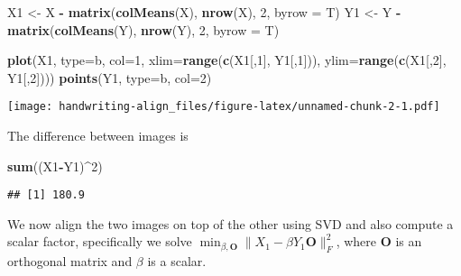 \documentclass[
]{article}
\newenvironment{Shaded}{\begin{snugshade}}{\end{snugshade}}
\newcommand{\AttributeTok}[1]{\textcolor[rgb]{0.13,0.29,0.53}{#1}}
\newcommand{\DecValTok}[1]{\textcolor[rgb]{0.00,0.00,0.81}{#1}}
\newcommand{\FunctionTok}[1]{\textcolor[rgb]{0.13,0.29,0.53}{\textbf{#1}}}
\newcommand{\NormalTok}[1]{#1}
\newcommand{\OtherTok}[1]{\textcolor[rgb]{0.56,0.35,0.01}{#1}}
\newcommand{\SpecialCharTok}[1]{\textcolor[rgb]{0.81,0.36,0.00}{\textbf{#1}}}
\newcommand{\StringTok}[1]{\textcolor[rgb]{0.31,0.60,0.02}{#1}}
\begin{document}
\begin{Shaded}
\begin{Highlighting}[]
\NormalTok{X1 }\OtherTok{\textless{}{-}}\NormalTok{ X }\SpecialCharTok{{-}} \FunctionTok{matrix}\NormalTok{(}\FunctionTok{colMeans}\NormalTok{(X), }\FunctionTok{nrow}\NormalTok{(X), }\DecValTok{2}\NormalTok{, }\AttributeTok{byrow =}\NormalTok{ T)}
\NormalTok{Y1 }\OtherTok{\textless{}{-}}\NormalTok{ Y }\SpecialCharTok{{-}} \FunctionTok{matrix}\NormalTok{(}\FunctionTok{colMeans}\NormalTok{(Y), }\FunctionTok{nrow}\NormalTok{(Y), }\DecValTok{2}\NormalTok{, }\AttributeTok{byrow =}\NormalTok{ T)}



\FunctionTok{plot}\NormalTok{(X1, }\AttributeTok{type=}\StringTok{\textquotesingle{}b\textquotesingle{}}\NormalTok{, }\AttributeTok{col=}\DecValTok{1}\NormalTok{, }\AttributeTok{xlim=}\FunctionTok{range}\NormalTok{(}\FunctionTok{c}\NormalTok{(X1[,}\DecValTok{1}\NormalTok{], Y1[,}\DecValTok{1}\NormalTok{])), }\AttributeTok{ylim=}\FunctionTok{range}\NormalTok{(}\FunctionTok{c}\NormalTok{(X1[,}\DecValTok{2}\NormalTok{], Y1[,}\DecValTok{2}\NormalTok{])))}
\FunctionTok{points}\NormalTok{(Y1, }\AttributeTok{type=}\StringTok{\textquotesingle{}b\textquotesingle{}}\NormalTok{, }\AttributeTok{col=}\DecValTok{2}\NormalTok{)}
\end{Highlighting}
\end{Shaded}

\texttt{[image: handwriting-align\_files/figure-latex/unnamed-chunk-2-1.pdf]}

The difference between images is

\begin{Shaded}
\begin{Highlighting}[]
\FunctionTok{sum}\NormalTok{((X1}\SpecialCharTok{{-}}\NormalTok{Y1)}\SpecialCharTok{\^{}}\DecValTok{2}\NormalTok{)}
\end{Highlighting}
\end{Shaded}

\begin{verbatim}
## [1] 180.9
\end{verbatim}

We now align the two images on top of the other using SVD and also
compute a scalar factor, specifically we solve
\(\min_{\beta,\mathbf{O}}\|X_1-\beta Y_1\mathbf{O}\|_{F}^2\), where
\(\mathbf{O}\) is an orthogonal matrix and \(\beta\) is a scalar.
\end{document}
